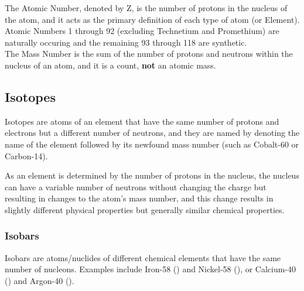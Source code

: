 \begin{defn}
The Atomic Number, denoted by Z, is the number of protons in the nucleus of the atom, and it acts as the primary definition of each type of atom (or Element). Atomic Numbers 1 through 92 (excluding Technetium and Promethium) are naturally occuring and the remaining 93 through 118 are synthetic.  \\

\noindent
The Mass Number is the sum of the number of protons and neutrons within the nucleus of an atom, and it is a count, \textbf{not} an atomic mass.
\end{defn}

\subsection{Isotopes}

\begin{defn}
Isotopes are atoms of an element that have the same number of protons and electrons but a different number of neutrons, and they are named by denoting the name of the element followed by its newfound mass number (such as Cobalt-60 or Carbon-14).
\end{defn}

\noindent
As an element is determined by the number of protons in the nucleus, the nucleus can have a variable number of neutrons without changing the charge but resulting in changes to the atom's mass number, and this change results in slightly different physical properties but generally similar chemical properties. \\

\noindent
{}

\subsubsection{Isobars}

\begin{defn}
Isobars are atoms/nuclides of different chemical elements that have the same number of nucleons. Examples include Iron-58 () and Nickel-58 (), or Calcium-40 () and Argon-40 ().
\end{defn}

